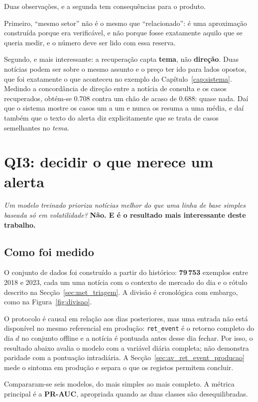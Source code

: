 Duas observações, e a segunda tem consequências para o produto.

Primeiro, ``mesmo setor'' não é o mesmo que ``relacionado'': é uma aproximação construída porque era
verificável, e não porque fosse exatamente aquilo que se queria medir, e o número deve ser lido com
essa reserva.

Segundo, e mais interessante: a recuperação capta \textbf{tema}, não \textbf{direção}. Duas notícias
podem ser sobre o mesmo assunto e o preço ter ido para lados opostos, que foi exatamente o que
aconteceu no exemplo do Capítulo~\ref{cap:sistema}. Medindo a concordância de direção entre a
notícia de consulta e os casos recuperados, obtém-se $0.708$ contra um chão de acaso de $0.688$: quase
nada. Daí que o sistema mostre os casos um a um e nunca os resuma a uma média, e daí também que o texto do
alerta diz explicitamente que se trata de casos semelhantes no \emph{tema}.

\section{QI3: decidir o que merece um alerta}
\label{sec:av_qi3}

\emph{Um modelo treinado prioriza notícias melhor do que uma linha de base simples baseada só em
volatilidade?} \textbf{Não. E é o resultado mais interessante deste trabalho.}

\subsection{Como foi medido}

O conjunto de dados foi construído a partir do histórico: \textbf{79\,753} exemplos entre 2018 e
2023, cada um uma notícia com o contexto de mercado do dia e o rótulo descrito na
Secção~\ref{sec:met_triagem}. A divisão é cronológica com embargo, como na
Figura~\ref{fig:divisao}.

O protocolo é causal em relação aos dias posteriores, mas uma entrada não está disponível no mesmo
referencial em produção: \texttt{ret\_event} é o retorno completo do dia $d$ no conjunto offline e
a notícia é pontuada antes desse dia fechar. Por isso, o resultado abaixo avalia o modelo com a
variável diária completa; não demonstra paridade com a pontuação intradiária. A
Secção~\ref{sec:av_ret_event_producao} mede o sintoma em produção e separa o que os registos permitem
concluir.

Compararam-se seis modelos, do mais simples ao mais completo. A métrica principal é a
\textbf{PR-AUC}, apropriada quando as duas classes são desequilibradas.

